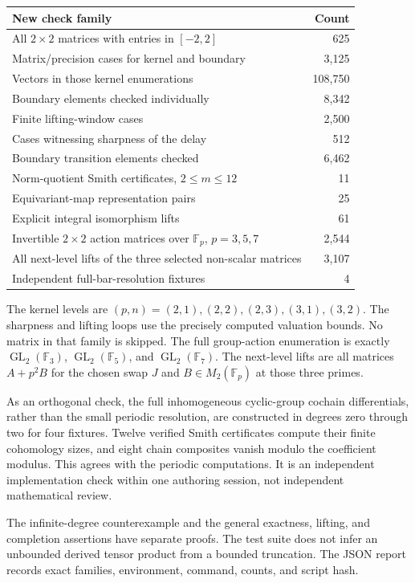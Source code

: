 \begin{center}
\begin{tabular}{lr}
\toprule
New check family & Count\\
\midrule
All $2\times2$ matrices with entries in $[-2,2]$ & 625\\
Matrix/precision cases for kernel and boundary & 3,125\\
Vectors in those kernel enumerations & 108,750\\
Boundary elements checked individually & 8,342\\
Finite lifting-window cases & 2,500\\
Cases witnessing sharpness of the delay & 512\\
Boundary transition elements checked & 6,462\\
Norm-quotient Smith certificates, $2\leq m\leq12$ & 11\\
Equivariant-map representation pairs & 25\\
Explicit integral isomorphism lifts & 61\\
Invertible $2\times2$ action matrices over $\mathbb F_p$, $p=3,5,7$ & 2,544\\
All next-level lifts of the three selected non-scalar matrices & 3,107\\
Independent full-bar-resolution fixtures & 4\\
\bottomrule
\end{tabular}
\end{center}

The kernel levels are $(p,n)=(2,1),(2,2),(2,3),(3,1),(3,2)$. The sharpness and lifting loops use the precisely computed valuation bounds. No matrix in that family is skipped. The full group-action enumeration is exactly $\operatorname{GL}_2(\mathbb F_3)$, $\operatorname{GL}_2(\mathbb F_5)$, and $\operatorname{GL}_2(\mathbb F_7)$. The next-level lifts are all matrices $A+p^2B$ for the chosen swap $J$ and $B\in M_2(\mathbb F_p)$ at those three primes.

As an orthogonal check, the full inhomogeneous cyclic-group cochain differentials, rather than the small periodic resolution, are constructed in degrees zero through two for four fixtures. Twelve verified Smith certificates compute their finite cohomology sizes, and eight chain composites vanish modulo the coefficient modulus. This agrees with the periodic computations. It is an independent implementation check within one authoring session, not independent mathematical review.

The infinite-degree counterexample and the general exactness, lifting, and completion assertions have separate proofs. The test suite does not infer an unbounded derived tensor product from a bounded truncation. The JSON report records exact families, environment, command, counts, and script hash.

